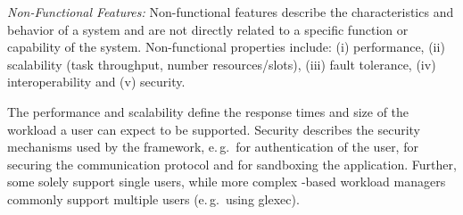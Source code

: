 \documentclass{sig-alternate}
\begin{document}

\emph{Non-Functional Features:} Non-functional features describe the
characteristics and behavior of a \pilotjob system and are not
directly related to a specific function or capability of the \pilotjob
system. Non-functional properties include: (i) performance, (ii)
scalability (task throughput, number resources/slots), (iii) fault
tolerance, (iv) interoperability and (v) security.



The performance and scalability define the response times and size of the
workload a user can expect to be supported. Security describes the security
mechanisms used by the framework, e.\,g.\ for authentication of the user, for
securing the communication protocol and for sandboxing the application.
Further, some \pilotjobs solely support single users, while more complex
\pilot-based workload managers commonly support multiple users (e.\,g.\ using
glexec).
\end{document}
